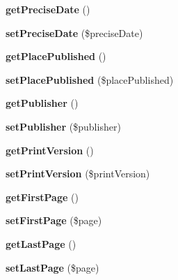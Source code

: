 \begin{DoxyCompactItemize}
\item 
\hypertarget{classBook_aa3a611aa695a3b3dbfe99da7009bb0dc}{
{\bfseries getPreciseDate} ()}
\label{classBook_aa3a611aa695a3b3dbfe99da7009bb0dc}

\item 
\hypertarget{classBook_aeb5fb45ae54332bdbd74bd003f5cb38f}{
{\bfseries setPreciseDate} (\$preciseDate)}
\label{classBook_aeb5fb45ae54332bdbd74bd003f5cb38f}

\item 
\hypertarget{classBook_a7770c535e8fa2e7ad0e3499b10684521}{
{\bfseries getPlacePublished} ()}
\label{classBook_a7770c535e8fa2e7ad0e3499b10684521}

\item 
\hypertarget{classBook_a2867197dc986704185dcfac5e3f89fe4}{
{\bfseries setPlacePublished} (\$placePublished)}
\label{classBook_a2867197dc986704185dcfac5e3f89fe4}

\item 
\hypertarget{classBook_a206b5dbcf89afd40b6434bd258414556}{
{\bfseries getPublisher} ()}
\label{classBook_a206b5dbcf89afd40b6434bd258414556}

\item 
\hypertarget{classBook_a937e0daaa2058c73800ed0b5f619fb60}{
{\bfseries setPublisher} (\$publisher)}
\label{classBook_a937e0daaa2058c73800ed0b5f619fb60}

\item 
\hypertarget{classBook_a2d10c1958294e358af45ec9c8adbad27}{
{\bfseries getPrintVersion} ()}
\label{classBook_a2d10c1958294e358af45ec9c8adbad27}

\item 
\hypertarget{classBook_a7a4ca9924e5201cb72410bf9e5b4d5c8}{
{\bfseries setPrintVersion} (\$printVersion)}
\label{classBook_a7a4ca9924e5201cb72410bf9e5b4d5c8}

\item 
\hypertarget{classBook_a77865d288d4190423c347896bb0b483c}{
{\bfseries getFirstPage} ()}
\label{classBook_a77865d288d4190423c347896bb0b483c}

\item 
\hypertarget{classBook_a01dacc8044d4fe2ce1be34b9b5a45665}{
{\bfseries setFirstPage} (\$page)}
\label{classBook_a01dacc8044d4fe2ce1be34b9b5a45665}

\item 
\hypertarget{classBook_acb00e915770817f08c776e6b097e0e99}{
{\bfseries getLastPage} ()}
\label{classBook_acb00e915770817f08c776e6b097e0e99}

\item 
\hypertarget{classBook_a410950585e1a0806765b689d7d90b0ca}{
{\bfseries setLastPage} (\$page)}
\label{classBook_a410950585e1a0806765b689d7d90b0ca}


\end{DoxyCompactItemize}
